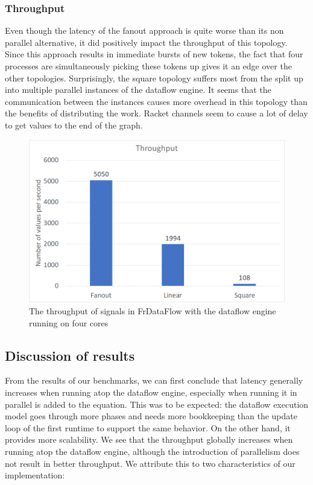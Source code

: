 \subsubsection{Throughput}

Even though the latency of the fanout approach is quite worse than its non parallel alternative, it did positively impact the throughput of this topology. Since this approach results in immediate bursts of new tokens, the fact that four processes are simultaneously picking these tokens up gives it an edge over the other topologies. 
Surprisingly, the square topology suffers most from the split up into multiple parallel instances of the dataflow engine. It seems that the communication between the instances causes more overhead in this topology than the benefits of distributing the work. Racket channels seem to cause a lot of delay to get values to the end of the graph. 

\begin{figure}[ht]
	\includegraphics[width=\textwidth]{images/Evaluation-WithDataFlowParallel-Throughput.png}
	\caption{The throughput of signals in FrDataFlow with the dataflow engine running on four cores}
	\label{fig:evaluation-withdataflow-throughput}
\end{figure}

\subsection{Discussion of results}

From the results of our benchmarks, we can first conclude that latency generally increases when running atop the dataflow engine, especially when running it in parallel is added to the equation. This was to be expected: the dataflow execution model goes through more phases and needs more bookkeeping than the update loop of the first runtime to support the same behavior. On the other hand, it provides more scalability. We see that the throughput globally increases when running atop the dataflow engine, although the introduction of parallelism does not result in better throughput. We attribute this to two characteristics of our implementation:

